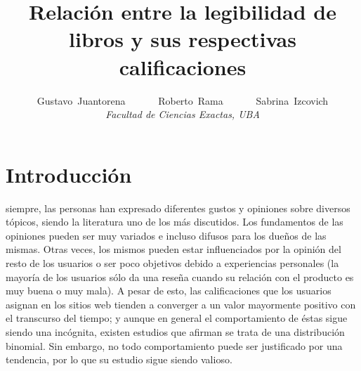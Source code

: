 \documentclass[12pt,journal,compsoc]{IEEEtran}
\begin{document}
\title{Relación entre la legibilidad de libros y sus respectivas calificaciones}

\author{Gustavo~Juantorena~~~~~~
        Roberto~Rama~~~~~~
        Sabrina~Izcovich\\
        \textit{Facultad de Ciencias Exactas, UBA}}



\maketitle
\IEEEdisplaynontitleabstractindextext
\IEEEpeerreviewmaketitle

\section{Introducción}
 siempre, las personas han expresado diferentes gustos y opiniones sobre diversos tópicos, siendo la literatura uno de los más discutidos. Los fundamentos de las opiniones pueden ser muy variados e incluso difusos para los dueños de las mismas. Otras veces, los mismos pueden estar influenciados por la opinión del resto de los usuarios\cite{muchnik} o ser poco objetivos debido a experiencias personales (la mayoría de los usuarios sólo da una reseña cuando su relación con el producto es muy buena o muy mala\cite{hu}). A pesar de esto, las calificaciones que los usuarios asignan en los sitios web tienden a converger a un valor mayormente positivo con el transcurso del tiempo\cite{zhang}; y aunque en general el comportamiento de éstas sigue siendo una incógnita, existen estudios que afirman se trata de una distribución binomial\cite{hu}. Sin embargo, no todo comportamiento puede ser justificado por una tendencia\cite{zhang}, por lo que su estudio sigue siendo valioso. 
\end{document}
